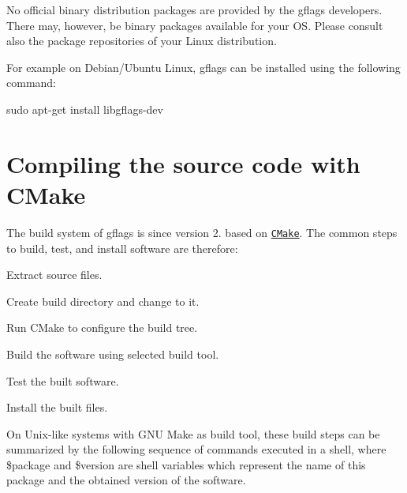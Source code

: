 No official binary distribution packages are provided by the gflags developers. There may, however, be binary packages available for your OS. Please consult also the package repositories of your Linux distribution.

For example on Debian/\+Ubuntu Linux, gflags can be installed using the following command\+: \begin{DoxyVerb}sudo apt-get install libgflags-dev
\end{DoxyVerb}


\section*{Compiling the source code with C\+Make }

The build system of gflags is since version 2. based on \href{http://cmake.org}{\tt C\+Make}. The common steps to build, test, and install software are therefore\+:


\begin{DoxyEnumerate}
\item Extract source files.
\item Create build directory and change to it.
\item Run C\+Make to configure the build tree.
\item Build the software using selected build tool.
\item Test the built software.
\item Install the built files.
\end{DoxyEnumerate}

On Unix-\/like systems with G\+NU Make as build tool, these build steps can be summarized by the following sequence of commands executed in a shell, where {\ttfamily \$package} and {\ttfamily \$version} are shell variables which represent the name of this package and the obtained version of the software. 


